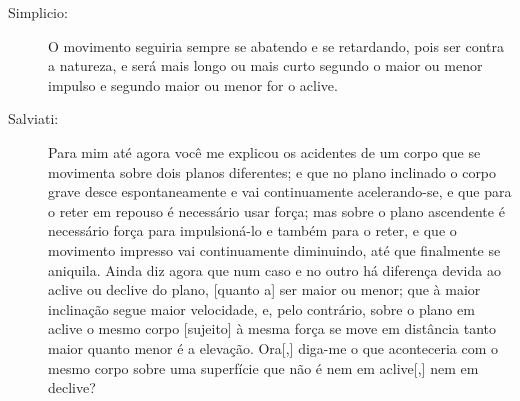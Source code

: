\begin{description}
\item[Simplicio:] O movimento seguiria sempre se abatendo e se retardando, pois ser contra a natureza, e será mais longo ou mais curto segundo o maior ou menor impulso e segundo maior ou menor for o aclive.

\item[Salviati:] Para mim até agora você me explicou os acidentes de um corpo que se movimenta sobre dois planos diferentes; e que no plano inclinado o corpo grave desce espontaneamente e vai continuamente acelerando-se, e que para o reter em repouso é necessário usar força; mas sobre o plano ascendente é necessário força para impulsioná-lo e também para o reter, e que o movimento impresso vai continuamente diminuindo, até que finalmente se aniquila. Ainda diz agora que num caso e no outro há diferença devida ao aclive ou declive do plano, [quanto a] ser maior ou menor; que à maior inclinação segue maior velocidade, e, pelo contrário, sobre o plano em aclive o mesmo corpo [sujeito] à mesma força se move em distância tanto maior quanto menor é a elevação. Ora[,] diga-me o que aconteceria com o mesmo corpo sobre uma superfície que não é nem em aclive[,] nem em declive?


\end{description}
